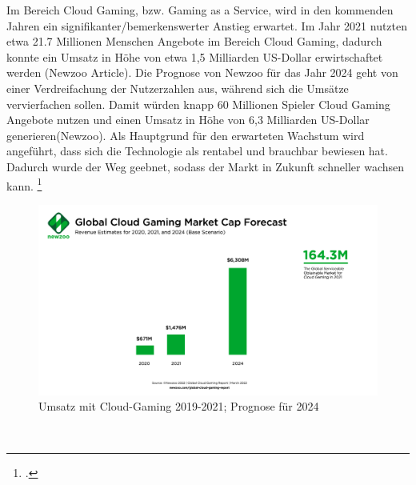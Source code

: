 \documentclass[12pt,toc=bib,toc=listof]{scrreprt}
\begin{document}
Im Bereich Cloud Gaming, bzw. Gaming as a Service, wird in den kommenden Jahren ein signifikanter/bemerkenswerter
 Anstieg erwartet. Im Jahr 2021 nutzten etwa 21.7 Millionen Menschen Angebote im Bereich Cloud Gaming, dadurch konnte ein
 Umsatz in Höhe von etwa 1,5 Milliarden US-Dollar erwirtschaftet werden (Newzoo Article). Die Prognose von Newzoo für das Jahr 
 2024 geht von einer Verdreifachung der Nutzerzahlen aus, während sich die Umsätze vervierfachen sollen. Damit würden knapp 60
 Millionen Spieler Cloud Gaming Angebote nutzen und einen Umsatz in Höhe von 6,3 Milliarden US-Dollar generieren(Newzoo). Als Hauptgrund für den erwarteten Wachstum wird angeführt, dass sich die Technologie als rentabel und brauchbar bewiesen hat. Dadurch wurde der Weg geebnet, sodass 
 der Markt in Zukunft schneller wachsen kann. \footcite [Vgl.] [] {Newzoo.2022}
\\%
\begin{figure}[h]
 \centering
  \includegraphics[scale=0.12]{Abbildungen/Newzoo_Global_Cloud_Gaming_Market_Cap_Forecast_March2022.png} 
  \caption[Newzoo 2022]{Umsatz mit Cloud-Gaming 2019-2021; Prognose für 2024}
\end{figure}
\\%
\end{document}
